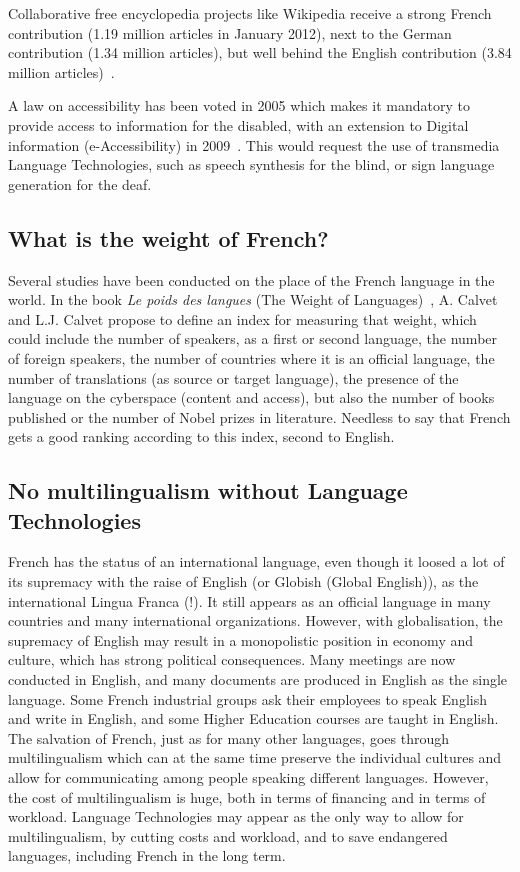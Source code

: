 \begin{multicols}{2}
Collaborative free encyclopedia projects like Wikipedia receive a
strong French contribution (1.19 million articles in January 2012),
next to the German contribution (1.34 million articles), but well behind the English contribution (3.84 million articles)~\cite{wikipediastats}.

A law on accessibility has been voted in 2005 which makes it mandatory
to provide access to information for the disabled, with an extension
to Digital information (e-Accessibility) in 2009~\cite{loi}. This would request
the use of transmedia Language Technologies, such as speech synthesis
for the blind, or sign language generation for the deaf.

\subsection{What is the weight of French?}

Several studies have been conducted on the place of the French
language in the world. In the book {\em Le poids des
langues} (The Weight of Languages)~\cite{calvet09}, A. Calvet and
L.J. Calvet propose to define an index for measuring that weight,
which could include the number of speakers, as a first or second
language, the number of foreign speakers, the number of countries
where it is an official language, the number of translations (as
source or target language), the presence of the language on the
cyberspace (content and access), but also the number of books
published or the number of Nobel prizes in literature. Needless to say
that French gets a good ranking according to this index, second to
English.

\subsection{No multilingualism without Language Technologies}

French has the status of an international language, even though it
loosed a lot of its supremacy with the raise of English (or Globish
(Global English)), as the international Lingua Franca (!). It still
appears as an official language in many countries and many
international organizations. However, with globalisation, the
supremacy of English may result in a monopolistic position in economy
and culture, which has strong political consequences. Many meetings
are now conducted in English, and many documents are produced in
English as the single language. Some French industrial groups ask
their employees to speak English and write in English, and some Higher
Education courses are taught in English. The salvation of French, just
as for many other languages, goes through multilingualism which can at
the same time preserve the individual cultures and allow for
communicating among people speaking different languages. However, the
cost of multilingualism is huge, both in terms of financing and in
terms of workload. Language Technologies may appear as the only way to
allow for multilingualism, by cutting costs and workload, and to save
endangered languages, including French in the long term.


\end{multicols}
